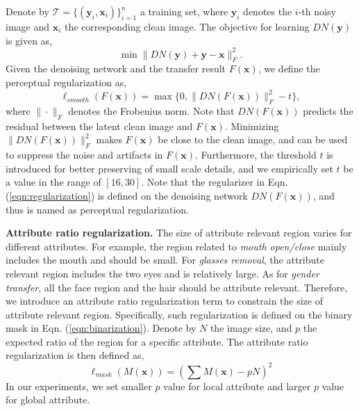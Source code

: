 \documentclass[journal]{IEEEtran}
\begin{document}
Denote by $\mathcal{T} = \{(\mathbf{y}_i, \mathbf{x}_i)\}_{i=1}^{n}$ a training set, where $\mathbf{y}_i$ denotes the $i$-th noisy image and $\mathbf{x}_i$ the corresponding clean image.
The objective for learning $DN(\mathbf{y})$ is given as,
\begin{equation}
\min \|DN(\mathbf{y}) + \mathbf{y} - \mathbf{x}\|^2_F.
\end{equation}
Given the denoising network and the transfer result $F(\mathbf{x})$, we define the perceptual regularization as,
\begin{equation}
\label{eqn:regularization}
\ell_{smooth}(F(\mathbf{x})) = \max \{0, \|DN(F(\mathbf{x}))\|^2_F-t\},
\end{equation}
where $\|\cdot\|_F$ denotes the Frobenius norm.
Note that $DN(F(\mathbf{x}))$ predicts the residual between the latent clean image and $F(\mathbf{x})$. Minimizing $\|DN(F(\mathbf{x}))\|^2_F$ makes $F(\mathbf{x})$ be close to the clean image, and can be used to suppress the noise and artifacts in $F(\mathbf{x})$.
Furthermore, the threshold $t$ is introduced for better preserving of small scale details, and we empirically set $t$ be a value in the range of $[16, 30]$.
Note that the regularizer in Eqn. (\ref{eqn:regularization}) is defined on the denoising network $DN(F(\mathbf{x}))$, and thus is named as perceptual regularization.











\textbf{Attribute ratio regularization.}\quad
The size of attribute relevant region varies for different attributes.
For example, the region related to \emph{mouth open/close} mainly includes the mouth and should be small.
For \emph{glasses removal}, the attribute relevant region includes the two eyes and is relatively large.
As for \emph{gender transfer}, all the face region and the hair should be attribute relevant.
Therefore, we introduce an attribute ratio regularization term to constrain the size of attribute relevant region.
Specifically, such regularization is defined on the binary mask in Eqn. (\ref{eqn:binarization}).
Denote by $N$ the image size, and $p$ the expected ratio of the region for a specific attribute.
The attribute ratio regularization is then defined as,
\begin{equation}
\label{eqn:ratio_regularization}
\ell_{mask}(M(\mathbf{x})) = (\sum M(\mathbf{x})- pN)^2
\end{equation}
In our experiments, we set smaller $p$ value for local attribute and larger $p$ value for global attribute.
\end{document}
